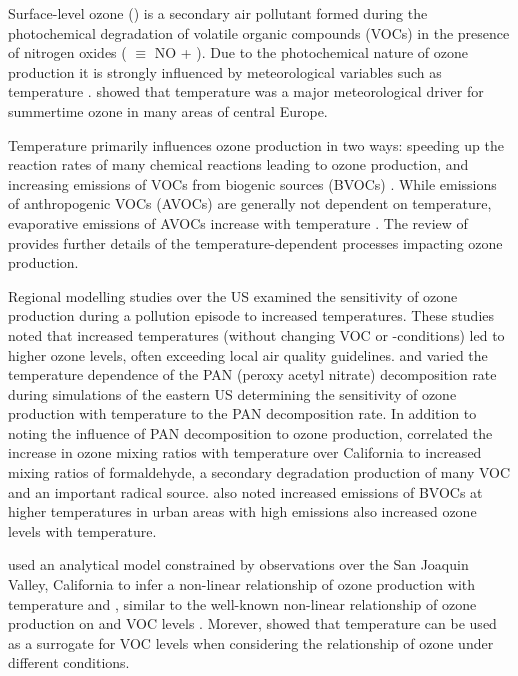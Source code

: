 Surface-level ozone () is a secondary air pollutant formed during the photochemical degradation of volatile organic compounds (VOCs) in the presence of nitrogen oxides ( $\equiv$ NO + ).
Due to the photochemical nature of ozone production it is strongly influenced by meteorological variables such as temperature \citep{Jacob:2009}.
\citet{Otero:2016} showed that temperature was a major meteorological driver for summertime ozone in many areas of central Europe.

Temperature primarily influences ozone production in two ways: speeding up the reaction rates of many chemical reactions leading to ozone production, and increasing emissions of VOCs from biogenic sources (BVOCs) \citep{Sillman:1995a}.
While emissions of anthropogenic VOCs (AVOCs) are generally not dependent on temperature, evaporative emissions of AVOCs increase with temperature \citep{Rubin:2006}.
The review of \citet{Pusede:2015} provides further details of the temperature-dependent processes impacting ozone production.

Regional modelling studies over the US \citep{Sillman:1995a, Steiner:2006, Dawson:2007} examined the sensitivity of ozone production during a pollution episode to increased temperatures.
These studies noted that increased temperatures (without changing VOC or -conditions) led to higher ozone levels, often exceeding local air quality guidelines.
\citet{Sillman:1995a} and \citet{Dawson:2007} varied the temperature dependence of the PAN (peroxy acetyl nitrate) decomposition rate during simulations of the eastern US determining the sensitivity of ozone production with temperature to the PAN decomposition rate.
In addition to noting the influence of PAN decomposition to ozone production, \citet{Steiner:2006} correlated the increase in ozone mixing ratios with temperature over California to increased mixing ratios of formaldehyde, a secondary degradation production of many VOC and an important radical source.
\citet{Steiner:2006} also noted increased emissions of BVOCs at higher temperatures in urban areas with high  emissions also increased ozone levels with temperature.

\citet{Pusede:2014} used an analytical model constrained by observations over the San Joaquin Valley, California to infer a non-linear relationship of ozone production with temperature and , similar to the well-known non-linear relationship of ozone production on  and VOC levels \citep{Sillman:1999}.
Morever, \citet{Pusede:2014} showed that temperature can be used as a surrogate for VOC levels when considering the relationship of ozone under different  conditions.


